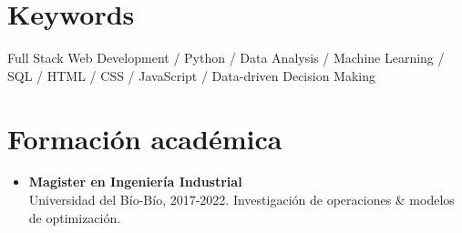 \documentclass[a4paper,10pt]{article}
\begin{document}
		\section*{Keywords}
	\small
	Full Stack Web Development / Python / Data Analysis / Machine Learning / SQL / HTML / CSS / JavaScript / Data-driven Decision Making
	
	\section*{Formación académica}
	\begin{itemize}[left=0pt]
		\item \textbf{Magister en Ingeniería Industrial} \\
		Universidad del Bío-Bío, 2017-2022. Investigación de operaciones \& modelos de optimización.
		
		
	\end{itemize}
	
\end{document}

